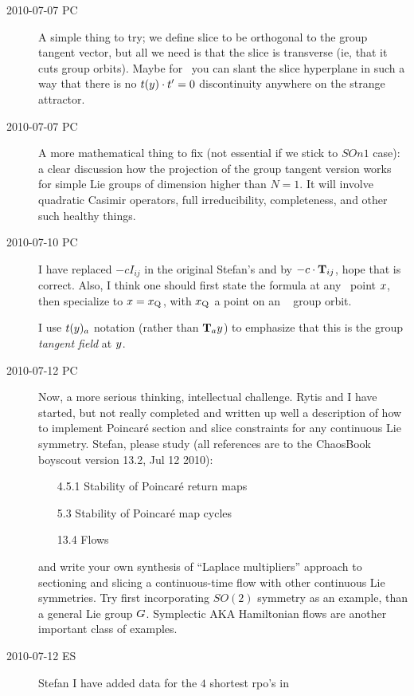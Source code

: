 \begin{description}
\item[2010-07-07 PC]
A simple thing to try; we define slice to be orthogonal to the group tangent vector, but all we need is that the slice is transverse (ie, that it cuts group orbits). Maybe for \cLe\ you can slant the slice hyperplane in such a way that there is no
$t(y) \cdot t'_{} =0$ discontinuity anywhere on the strange attractor.

\item[2010-07-07 PC]
A more mathematical thing to fix (not essential if we stick to $SOn{1}$ case): a clear discussion how the projection of the group tangent version works for simple Lie groups of dimension higher than $N=1$. It will involve quadratic Casimir operators, full irreducibility, completeness, and other such healthy things.

\item[2010-07-10 PC] I have replaced $-c I_{ij}$ in
the original Stefan's
 and  by
$-c \cdot \mathbf{T}_{ij}$, hope that is correct. Also,
I think one should first state the formula at any \statesp\
point $x$, then specialize to $x = x_{\mathrm{Q}_{}}$, with
$x_{\mathrm{Q}_{}}$ a point on an \reqv\ \REQB{} group orbit.

I use $t(y)_a$ notation (rather than
$\mathbf{T}_{a}y$) to emphasize that this is the
group \emph{tangent field} at $y$.

\item[2010-07-12 PC] Now, a more serious thinking,
intellectual
challenge. Rytis and I have started, but not really completed
and written up well a description of how to implement Poincar\'e
section and slice constraints for any continuous Lie symmetry.
Stefan, please study (all references are to the ChaosBook
boyscout version 13.2, Jul 12 2010):
\begin{itemize}
  \item[4.5.1] Stability of Poincar\'e return maps
  \item[5.3] Stability of Poincar\'e map cycles
  \item[13.4] Flows
\end{itemize}
and write your own synthesis of ``Laplace multipliers''
approach to sectioning and slicing a continuous-time
flow with other continuous Lie symmetries. Try first
incorporating $SO(2)$ symmetry as an example, than
a general Lie group $G$. Symplectic AKA Hamiltonian
flows are another important class of examples.

\item[2010-07-12 ES] Stefan I have added data for the $4$ shortest rpo's
in


\end{description}
